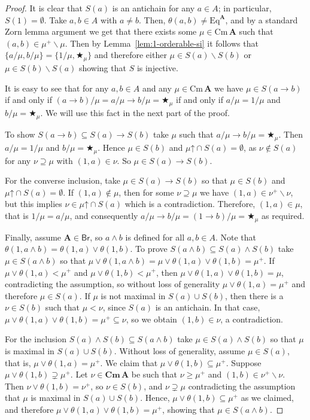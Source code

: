 \documentclass{amsart}
\newcommand{\alg}[1]{\mathbf{#1}}
\newcommand{\var}[1]{\mathsf{#1}}
\newcommand{\Cm}[1]{\mathbf{Cm}\, #1}
\newcommand{\cm}[1]{\mathrm{Cm}\, #1}
\def\ra{\rightarrow}
\def\up#1{{#1}\mathord{\uparrow}}
\def\op{\bigstar}
\begin{document}
\begin{proof}
It is clear that $S(a)$ is an antichain for any $a\in A$; in particular, $S(1) =
\emptyset$.  Take $a,b\in A$ with $a\neq b$. Then, $\theta(a,b)\neq
\mathrm{Eq}^{\alg{A}}$, and by a standard Zorn lemma argument we get that there
exists some $\mu\in \cm{\alg{A}}$ such that $(a,b)\in\mu^+\smallsetminus\mu$. 
Then by Lemma~\ref{lem:1-orderable-si} it follows that
$\{a/\mu,b/\mu\} = \{1/\mu,\op_\mu\}$ and therefore either
$\mu\in S(a)\smallsetminus S(b)$ or $\mu\in S(b)\smallsetminus S(a)$ showing that
$S$ is injective. 

It is easy to see that for any $a,b\in A$ and any $\mu\in\cm{\alg{A}}$ we have
$\mu\in S(a\ra b)$ if and only if $(a\ra b)/\mu = a/\mu\ra b/\mu = \op_\mu$
if and only if $a/\mu = 1/\mu$ and $b/\mu = \op_\mu$. We will use this fact in
the next part of the proof.

To show $S(a\ra b)\subseteq S(a)\ra S(b)$ take $\mu$ such that
$a/\mu\ra b/\mu = \op_\mu$. Then $a/\mu = 1/\mu$ and $b/\mu = \op_\mu$. Hence 
$\mu\in S(b)$ and $\up{\mu}\cap S(a) = \emptyset$, 
as $\nu\notin S(a)$ for any $\nu \supseteq \mu$ with
$(1,a)\in\nu$. So $\mu\in S(a)\ra S(b)$.

For the converse inclusion, take $\mu\in S(a)\ra S(b)$ so that
$\mu\in S(b)$ and $\up{\mu}\cap S(a) = \emptyset$. If
$(1,a)\notin \mu$, then for some $\nu\supseteq \mu$ we have
$(1,a)\in\nu^+\smallsetminus \nu$, but this implies
$\nu\in \up{\mu}\cap S(a)$ which is a contradiction. 
Therefore, $(1,a)\in \mu$, that is $1/\mu = a/\mu$, and consequently
$a/\mu \ra b/\mu = (1\ra b)/\mu = \op_\mu$ as required. 

Finally, assume $\alg{A}\in\var{Br}$, so $a\wedge b$ is defined for all $a,b\in
A$. Note that $\theta(1, a\wedge b) = \theta(1,a)\vee\theta(1,b)$.
To prove $S(a\wedge b) \subseteq S(a)\wedge S(b)$ take $\mu\in S(a\wedge b)$
so that $\mu\vee\theta(1,a\wedge b) = \mu\vee\theta(1,a)\vee\theta(1,b) =
\mu^+$. If $\mu\vee\theta(1,a)<\mu^+$ and $\mu\vee\theta(1,b)<\mu^+$, then
$\mu\vee\theta(1,a)\vee\theta(1,b) = \mu$, contradicting the assumption, so
without loss of generality $\mu\vee\theta(1,a) =\mu^+$ and therefore
$\mu\in S(a)$. If $\mu$ is not maximal in $S(a)\cup S(b)$, then there is a
$\nu\in S(b)$ such that $\mu<\nu$, since $S(a)$ is an antichain.
In that case,
$\mu\vee\theta(1,a)\vee\theta(1,b) = \mu^+\subseteq \nu$,
so we obtain $(1,b)\in \nu$, a contradiction. 

For the inclusion $S(a)\wedge S(b) \subseteq S(a\wedge b)$ take
$\mu \in S(a)\wedge S(b)$ so that $\mu$ is maximal in $S(a)\cup S(b)$.
Without loss of generality, assume $\mu \in S(a)$, that is,
$\mu\vee\theta(1,a) = \mu^+$.
We claim that $\mu\vee\theta(1,b) \subseteq \mu^+$.
Suppose $\mu\vee\theta(1,b) \supsetneq \mu^+$. Let $\nu\in\Cm{\alg{A}}$
be such that $\nu\geq\mu^+$ and $(1,b)\in\nu^+\smallsetminus\nu$. 
Then $\nu\vee\theta(1,b) = \nu^+$, so $\nu\in S(b)$,
and $\nu\supsetneq\mu$ contradicting the assumption that $\mu$ is maximal
in $S(a)\cup S(b)$. Hence, $\mu\vee\theta(1,b)\subseteq \mu^+$ as we claimed, and
therefore $\mu\vee\theta(1,a)\vee \theta(1,b) = \mu^+$, showing that
$\mu\in S(a\wedge b)$.


\end{proof}
\end{document}

